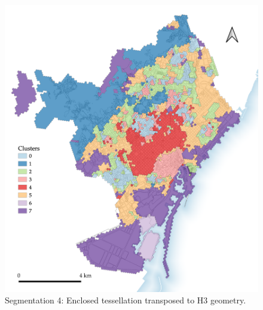 \documentclass[a4paper, nobind]{templates/ociamthesis}
\begin{document}
\begin{figure}

{\centering \includegraphics[width=.8\paperwidth]{figures/maps/H3_8cls_5sw 2} 

}

\caption[Segmentation 4: ET transposed to H3]{Segmentation 4: Enclosed tessellation transposed to H3 geometry.}\label{fig:ET-H3-map-BCN}
\end{figure}
\end{document}
